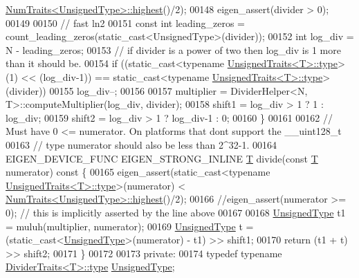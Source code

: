 \begin{DoxyCode}
      \hyperlink{group___core___module_struct_eigen_1_1_num_traits}{NumTraits<UnsignedType>::highest}()/2);
00148     eigen\_assert(divider > 0);
00149 
00150     \textcolor{comment}{// fast ln2}
00151     \textcolor{keyword}{const} \textcolor{keywordtype}{int} leading\_zeros = count\_leading\_zeros(static\_cast<UnsignedType>(divider));
00152     \textcolor{keywordtype}{int} log\_div = N - leading\_zeros;
00153     \textcolor{comment}{// if divider is a power of two then log\_div is 1 more than it should be.}
00154     \textcolor{keywordflow}{if} ((\textcolor{keyword}{static\_cast<}typename \hyperlink{class_eigen_1_1internal_1_1_tensor_lazy_evaluator_writable}{UnsignedTraits<T>::type}\textcolor{keyword}{>}(1) << (log\_div-1)) == \textcolor{keyword}{
      static\_cast<}typename \hyperlink{class_eigen_1_1internal_1_1_tensor_lazy_evaluator_writable}{UnsignedTraits<T>::type}\textcolor{keyword}{>}(divider))
00155       log\_div--;
00156 
00157     multiplier = DividerHelper<N, T>::computeMultiplier(log\_div, divider);
00158     shift1 = log\_div > 1 ? 1 : log\_div;
00159     shift2 = log\_div > 1 ? log\_div-1 : 0;
00160   \}
00161 
00162   \textcolor{comment}{// Must have 0 <= numerator. On platforms that dont support the \_\_uint128\_t}
00163   \textcolor{comment}{// type numerator should also be less than 2^32-1.}
00164   EIGEN\_DEVICE\_FUNC EIGEN\_STRONG\_INLINE \hyperlink{group___sparse_core___module}{T} divide(\textcolor{keyword}{const} \hyperlink{group___sparse_core___module}{T} numerator)\textcolor{keyword}{ const }\{
00165     eigen\_assert(\textcolor{keyword}{static\_cast<}typename \hyperlink{class_eigen_1_1internal_1_1_tensor_lazy_evaluator_writable}{UnsignedTraits<T>::type}\textcolor{keyword}{>}(numerator) < 
      \hyperlink{group___core___module_struct_eigen_1_1_num_traits}{NumTraits<UnsignedType>::highest}()/2);
00166     \textcolor{comment}{//eigen\_assert(numerator >= 0); // this is implicitly asserted by the line above}
00167 
00168     \hyperlink{class_eigen_1_1internal_1_1_tensor_lazy_evaluator_writable}{UnsignedType} t1 = muluh(multiplier, numerator);
00169     \hyperlink{class_eigen_1_1internal_1_1_tensor_lazy_evaluator_writable}{UnsignedType} t = (\textcolor{keyword}{static\_cast<}\hyperlink{class_eigen_1_1internal_1_1_tensor_lazy_evaluator_writable}{UnsignedType}\textcolor{keyword}{>}(numerator) - t1) >> shift1;
00170     \textcolor{keywordflow}{return} (t1 + t) >> shift2;
00171   \}
00172 
00173  \textcolor{keyword}{private}:
00174   \textcolor{keyword}{typedef} \textcolor{keyword}{typename} \hyperlink{class_eigen_1_1internal_1_1_tensor_lazy_evaluator_writable}{DividerTraits<T>::type} \hyperlink{class_eigen_1_1internal_1_1_tensor_lazy_evaluator_writable}{UnsignedType};

\end{DoxyCode}
